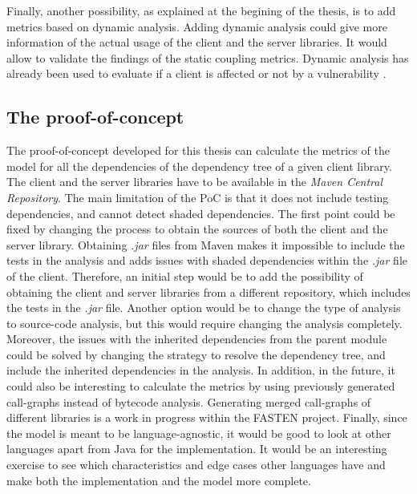 Finally, another possibility, as explained at the begining of the thesis, is to add metrics based on dynamic analysis. Adding dynamic analysis could give more information of the actual usage of the client and the server libraries. It would allow to validate the findings of the static coupling metrics. Dynamic analysis has already been used to evaluate if a client is affected or not by a vulnerability \cite{plate2015impact}.

\subsection{The proof-of-concept}

The proof-of-concept developed for this thesis can calculate the metrics of the model for all the dependencies of the dependency tree of a given client library. The client and the server libraries have to be available in the \textit{Maven Central Repository}. The main limitation of the PoC is that it does not include testing dependencies, and cannot detect shaded dependencies. The first point could be fixed by changing the process to obtain the sources of both the client and the server library. Obtaining \textit{.jar} files from Maven makes it impossible to include the tests in the analysis and adds issues with shaded dependencies within the \textit{.jar} file of the client. Therefore, an initial step would be to add the possibility of obtaining the client and server libraries from a different repository, which includes the tests in the \textit{.jar} file. Another option would be to change the type of analysis to source-code analysis, but this would require changing the analysis completely. Moreover, the issues with the inherited dependencies from the parent module could be solved by changing the strategy to resolve the dependency tree, and include the inherited dependencies in the analysis.
In addition, in the future, it could also be interesting to calculate the metrics by using previously generated call-graphs instead of bytecode analysis. Generating merged call-graphs of different libraries is a work in progress within the FASTEN project. Finally, since the model is meant to be language-agnostic, it would be good to look at other languages apart from Java for the implementation. It would be an interesting exercise to see which characteristics and edge cases other languages have and make both the implementation and the model more complete.
